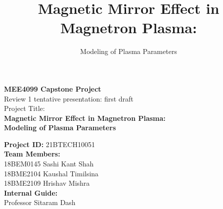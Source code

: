 \documentclass{beamer}
\title[]{Magnetic Mirror Effect in Magnetron Plasma:}
\subtitle{Modeling of Plasma Parameters}
\begin{document}
	
	\begin{frame}
		\selectfont 
		\begin{center}
			\large{\textbf{MEE4099 Capstone Project}} \\ 
			\normalsize{Review 1 tentative presentation: first draft} \\
			\normalsize{Project Title:} \\ 
			\Large{\textbf{Magnetic Mirror Effect in Magnetron Plasma:}} \\
			\Large{\textbf{Modeling of Plasma Parameters}} \\
		\end{center}
		\textbf{Project ID:} 21BTECH10051 \\
		\textbf{Team Members:} \\
		18BEM0145 Sashi Kant Shah \\
		18BME2104 Kaushal Timilsina \\
		18BME2109 Hrishav Mishra \\
		
		\noindent \textbf{Internal Guide:} \\
		Professor Sitaram Dash	
	\end{frame}	
\end{document}
